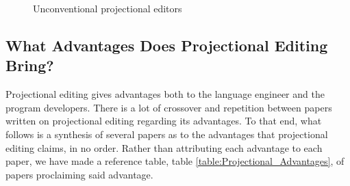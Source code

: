 \begin{figure}[h]
    \begin{center}
        
        \caption{Unconventional projectional editors}
    \label{fig:leftfield}
    \end{center}
\end{figure}

\subsection{What Advantages Does Projectional Editing Bring?}
\label{section:projectional_advantages}

Projectional editing gives advantages both to the language engineer and the program developers.
There is a lot of crossover and repetition between papers written on projectional editing regarding its advantages.
To that end, what follows is a synthesis of several papers as to the advantages that projectional editing claims, in no order.
Rather than attributing each advantage to each paper, we have made a reference table, table \ref{table:Projectional_Advantages}, of papers proclaiming said advantage. 
 
